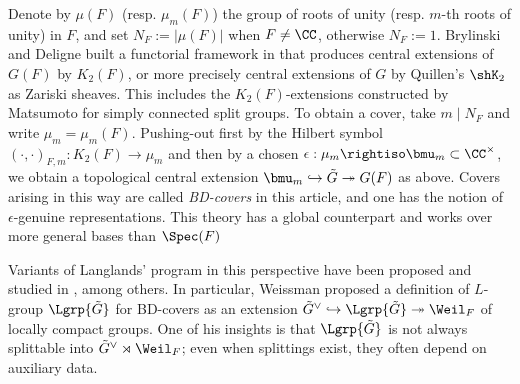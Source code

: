 \documentclass[a4paper,10pt]{article}
\begin{document}
Denote by $\mu(F)$ (resp. $\mu_m(F)$) the group of roots of unity (resp. $m$-th roots of unity) in $F$, and set $N_F := |\mu(F)|$ when $F \neq \CC$, otherwise $N_F := 1$. Brylinski and Deligne built a functorial framework in \cite{BD01} that produces central extensions of $G(F)$ by $K_2(F)$, or more precisely central extensions of $G$ by Quillen's $\shK_2$ as Zariski sheaves. This includes the $K_2(F)$-extensions constructed by Matsumoto \cite{Mat69} for simply connected split groups. To obtain a cover, take $m \mid N_F$ and write $\mu_m = \mu_m(F)$. Pushing-out first by the Hilbert symbol $(\cdot, \cdot)_{F,m}: K_2(F) \to \mu_m$ and then by a chosen $\epsilon: \mu_m \rightiso \bmu_m \subset \CC^\times$, we obtain a topological central extension $\bmu_m \hookrightarrow \tilde{G} \twoheadrightarrow G(F)$ as above. Covers arising in this way are called \emph{BD-covers} in this article, and one has the notion of $\epsilon$-genuine representations. This theory has a global counterpart and works over more general bases than $\Spec(F)$

Variants of Langlands' program in this perspective have been proposed and studied in \cite{GG,Weis17}, among others. In particular, Weissman \cite{Weis17} proposed a definition of $L$-group $\Lgrp{\tilde{G}}$ for BD-covers as an extension $\tilde{G}^\vee \hookrightarrow \Lgrp{\tilde{G}} \twoheadrightarrow \Weil_F$ of locally compact groups. One of his insights is that $\Lgrp{\tilde{G}}$ is not always splittable into $\tilde{G}^\vee \rtimes \Weil_F$; even when splittings exist, they often depend on auxiliary data.
\end{document}
